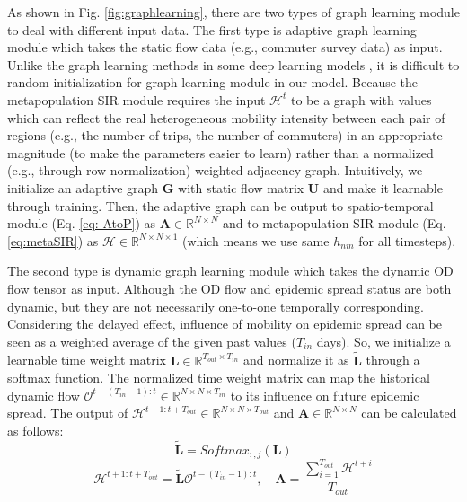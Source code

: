 \documentclass[lettersize,journal]{IEEEtran}
\begin{document}
As shown in Fig. {\ref{fig:graphlearning}}, there are two types of graph learning module to deal with different input data. The first type is adaptive graph learning module which takes the static flow data (e.g., commuter survey data) as input. Unlike the graph learning methods in some deep learning models \cite{ref_23,ref_26,ref_27}, it is difficult to random initialization for graph learning module in our model. Because the metapopulation SIR module requires the input $\mathcal{H}^t$ to be a graph with values which can reflect the real heterogeneous mobility intensity between each pair of regions (e.g., the number of trips, the number of commuters) in an appropriate magnitude (to make the parameters easier to learn) rather than a normalized (e.g., through row normalization) weighted adjacency graph. 
Intuitively, we initialize an adaptive graph $\textbf{G}$ with static flow matrix $\mathbf{U}$ and make it learnable through training. Then, the adaptive graph can be output to spatio-temporal module (Eq. \ref{eq: AtoP}) as $\textbf{A}\in \mathbb{R}^{N \times N}$ and to metapopulation SIR module (Eq. \ref{eq:metaSIR}) as $\mathcal H \in \mathbb{R}^{N \times N \times 1}$ (which means we use same $h_{nm}$ for all timesteps). 

The second type is dynamic graph learning module which takes the dynamic OD flow tensor as input. Although the OD flow and epidemic spread status are both dynamic, but they are not necessarily one-to-one temporally corresponding. Considering the delayed effect, influence of mobility on epidemic spread can be seen as a weighted average of the given past values ($T_{in}$ days). So, we initialize a learnable time weight matrix $\textbf{L}\in \mathbb{R}^{T_{out} \times T_{in}}$ and normalize it as $\mathbf{\tilde{L}}$ through a softmax function. The normalized time weight matrix can map the historical dynamic flow $\mathcal O^{t-(T_{in}-1):t} \in \mathbb{R}^{N \times N \times T_{in}}$ to its influence on future epidemic spread. The output of $\mathcal H^{{t+1}:{t+T_{out}}} \in \mathbb{R}^{N \times N \times T_{out}}$ and $\textbf{A}\in \mathbb{R}^{N \times N}$ can be calculated as follows:
\begin{equation}
    \mathbf{\tilde{L}} = Softmax_{:,j}(\mathbf{L})
\end{equation}
\begin{equation}
    \mathcal H^{{t+1}:{t+T_{out}}} = \mathbf{\tilde{L}} \mathcal O^{t-(T_{in}-1):t}, \quad \mathbf{A} = \frac{\sum_{i=1}^{T_{out}}\mathcal H^{t+i}}{T_{out}}
\end{equation}
\end{document}
